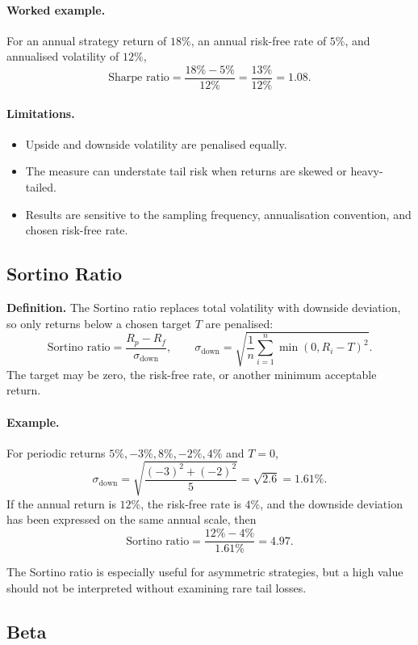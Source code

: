 \documentclass[12pt,openany]{book}
\theoremstyle{definition}
\theoremstyle{remark}
\begin{document}
\paragraph{Worked example.}
For an annual strategy return of \(18\%\), an annual risk-free rate of
\(5\%\), and annualised volatility of \(12\%\),
\[
\text{Sharpe ratio}
 =\frac{18\%-5\%}{12\%}
 =\frac{13\%}{12\%}
 =\mathbf{1.08}.
\]

\paragraph{Limitations.}
\begin{itemize}
    \item Upside and downside volatility are penalised equally.
    \item The measure can understate tail risk when returns are skewed or
    heavy-tailed.
    \item Results are sensitive to the sampling frequency, annualisation
    convention, and chosen risk-free rate.
\end{itemize}

\subsection{Sortino Ratio}

\textbf{Definition.} The Sortino ratio replaces total volatility with
downside deviation, so only returns below a chosen target \(T\) are
penalised:
\[
\text{Sortino ratio}=\frac{R_p-R_f}{\sigma_{\mathrm{down}}},
\qquad
\sigma_{\mathrm{down}}
 =\sqrt{\frac{1}{n}\sum_{i=1}^{n}\min(0,R_i-T)^2}.
\]
The target may be zero, the risk-free rate, or another minimum acceptable
return.

\paragraph{Example.}
For periodic returns \(5\%,-3\%,8\%,-2\%,4\%\) and \(T=0\),
\[
\sigma_{\mathrm{down}}
 =\sqrt{\frac{(-3)^2+(-2)^2}{5}}
 =\sqrt{2.6}
 =1.61\%.
\]
If the annual return is \(12\%\), the risk-free rate is \(4\%\), and the
downside deviation has been expressed on the same annual scale, then
\[
\text{Sortino ratio}=\frac{12\%-4\%}{1.61\%}=4.97.
\]

The Sortino ratio is especially useful for asymmetric strategies, but a high
value should not be interpreted without examining rare tail losses.

\subsection{Beta}
\end{document}
